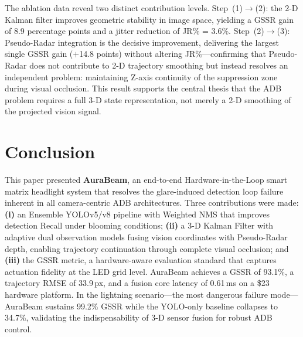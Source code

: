 \documentclass{jstarticle}
\theoremstyle{remark}
\begin{document}
The ablation data reveal two distinct contribution levels.
Step~(1)$\to$(2): the 2-D Kalman filter improves geometric stability
in image space, yielding a GSSR gain of 8.9 percentage points and a
jitter reduction of JR\% = 3.6\%.
Step~(2)$\to$(3): Pseudo-Radar integration is the decisive improvement,
delivering the largest single GSSR gain ($+$14.8 points) without
altering JR\%---confirming that Pseudo-Radar does not contribute to
2-D trajectory smoothing but instead resolves an independent problem:
maintaining Z-axis continuity of the suppression zone during visual
occlusion. This result supports the central thesis that the ADB
problem requires a full 3-D state representation, not merely a 2-D
smoothing of the projected vision signal.

\section{Conclusion}
\label{sec:conclusion}

This paper presented \textbf{AuraBeam}, an end-to-end
Hardware-in-the-Loop smart matrix headlight system that resolves the
glare-induced detection loop failure inherent in all camera-centric ADB
architectures. Three contributions were made: \textbf{(i)} an Ensemble
YOLOv5/v8 pipeline with Weighted NMS that improves detection Recall
under blooming conditions; \textbf{(ii)} a 3-D Kalman Filter with
adaptive dual observation models fusing vision coordinates with
Pseudo-Radar depth, enabling trajectory continuation through complete
visual occlusion; and \textbf{(iii)} the GSSR metric, a
hardware-aware evaluation standard that captures actuation fidelity at
the LED grid level. AuraBeam achieves a GSSR of 93.1\%, a trajectory
RMSE of 33.9\,px, and a fusion core latency of 0.61\,ms on a \$23
hardware platform. In the lightning scenario---the most dangerous
failure mode---AuraBeam sustains 99.2\% GSSR while the YOLO-only
baseline collapses to 34.7\%, validating the indispensability of 3-D
sensor fusion for robust ADB control.
\end{document}

